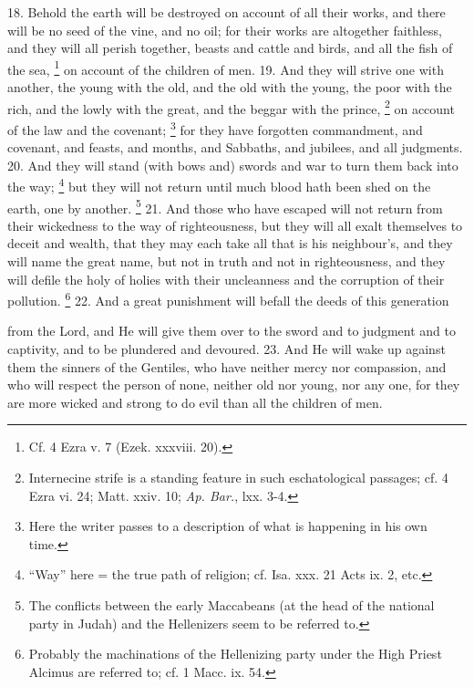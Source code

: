 18. Behold the earth will be destroyed on account of all their works, and there will be no seed of the vine, and no oil; for their works are altogether faithless, and they will all perish together, beasts and cattle and birds, and all the fish of the sea, \footnote{Cf. 4 Ezra v. 7 (Ezek. xxxviii. 20).} on account of the children of men. 19. And they will strive one with another, the young with the old, and the old with the young, the poor with the rich, and the lowly with the great, and the beggar with the prince, \footnote{Internecine strife is a standing feature in such eschatological passages; cf. 4 Ezra vi. 24; Matt. xxiv. 10; \emph{Ap. Bar.}, lxx. 3-4.} on account of the law and the covenant; \footnote{Here the writer passes to a description of what is happening in his own time.} for they have forgotten commandment, and covenant, and feasts, and months, and Sabbaths, and jubilees, and all judgments. 20. And they will stand (with bows and) swords and war to turn them back into the way; \footnote{``Way'' here = the true path of religion; cf. Isa. xxx. 21 Acts ix. 2, etc.} but they will not return until much blood hath been shed on the earth, one by another. \footnote{The conflicts between the early Maccabeans (at the head of the national party in Judah) and the Hellenizers seem to be referred to.} 21. And those who have escaped will not return from their wickedness to the way of righteousness, but they will all exalt themselves to deceit and wealth, that they may each take all that is his neighbour's, and they will name the great name, but not in truth and not in righteousness, and they will defile the holy of holies with their uncleanness and the corruption of their pollution. \footnote{Probably the machinations of the Hellenizing party under the High Priest Alcimus are referred to; cf. 1 Macc. ix. 54.} 22. And a great punishment will befall the deeds of this generation

from the Lord, and He will give them over to the sword and to judgment and to captivity, and to be plundered and devoured. 23. And He will wake up against them the sinners of the Gentiles, who have neither mercy nor compassion, and who will respect the person of none, neither old nor young, nor any one, for they are more wicked and strong to do evil than all the children of men.

